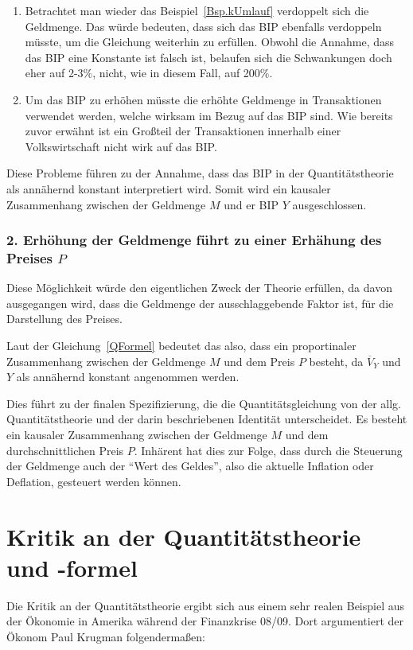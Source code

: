 \begin{enumerate}
    \item Betrachtet man wieder das Beispiel\, \vref*{Bsp.kUmlauf} verdoppelt sich die Geldmenge. Das würde bedeuten, dass sich das BIP ebenfalls verdoppeln müsste, um die Gleichung weiterhin zu erfüllen. Obwohl die Annahme, dass das BIP eine Konstante ist falsch ist, belaufen sich die Schwankungen doch eher auf 2-3\%, nicht, wie in diesem Fall, auf 200\%.
    \item Um das BIP zu erhöhen müsste die erhöhte Geldmenge in Transaktionen verwendet werden, welche wirksam im Bezug auf das BIP sind. Wie bereits zuvor erwähnt ist ein Großteil der Transaktionen innerhalb einer Volkswirtschaft nicht wirk auf das BIP.
\end{enumerate}

Diese Probleme führen zu der Annahme, dass das BIP in der Quantitätstheorie als annähernd konstant interpretiert wird. Somit wird ein kausaler Zusammenhang zwischen der Geldmenge $M$ und er BIP $Y$ ausgeschlossen.

\subsubsection*{2. Erhöhung der Geldmenge führt zu einer Erhähung des Preises $P$}
Diese Möglichkeit würde den eigentlichen Zweck der Theorie erfüllen, da davon ausgegangen wird, dass die Geldmenge der ausschlaggebende Faktor ist, für die Darstellung des Preises.

Laut der Gleichung\, \vref*{QFormel} bedeutet das also, dass ein proportinaler Zusammenhang zwischen der Geldmenge $M$ und dem Preis $P$ besteht, da $\overline{V}_Y$ und $Y$ als annähernd konstant angenommen werden.

Dies führt zu der finalen Spezifizierung, die die Quantitätsgleichung von der allg. Quantitätstheorie und der darin beschriebenen Identität unterscheidet. Es besteht ein kausaler Zusammenhang zwischen der Geldmenge $M$ und dem durchschnittlichen Preis $P$.
Inhärent hat dies zur Folge, dass durch die Steuerung der Geldmenge auch der \enquote{Wert des Geldes}, also die aktuelle Inflation oder Deflation, gesteuert werden können.

\section{Kritik an der Quantitätstheorie und -formel}

Die Kritik an der Quantitätstheorie ergibt sich aus einem sehr realen Beispiel aus der Ökonomie in Amerika während der Finanzkrise 08/09. Dort argumentiert der Ökonom Paul Krugman folgendermaßen:

